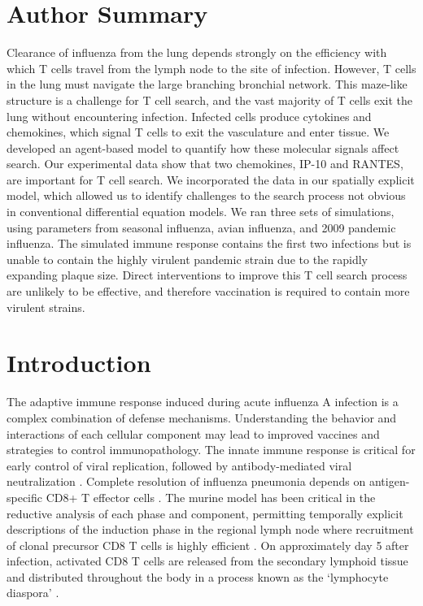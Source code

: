 \documentclass[10pt]{article}
\begin{document}
\section*{Author Summary}

Clearance of influenza from the lung depends strongly on the efficiency with which T cells travel from the lymph node to the site of infection.  However, T cells in the lung must navigate the large branching bronchial network.  This maze-like structure is a challenge for T cell search, and the vast majority of T cells exit the lung without encountering infection.  Infected cells produce cytokines and chemokines, which signal T cells to exit the vasculature and enter tissue.  We developed an agent-based model to quantify how these molecular signals affect search.  Our experimental data show that two chemokines, IP-10 and RANTES, are important for T cell search.  We incorporated the data in our spatially explicit model, which allowed us to identify challenges to the search process not obvious in conventional differential equation models.  We ran three sets of simulations, using parameters from seasonal influenza, avian influenza, and 2009 pandemic influenza.  The simulated immune response contains the first two infections but is unable to contain the highly virulent pandemic strain due to the rapidly expanding plaque size.  Direct interventions to improve this T cell search process are unlikely to be effective, and therefore vaccination is required to contain more virulent strains.

\section*{Introduction}

The adaptive immune response induced during acute influenza A infection is a complex combination of defense mechanisms.  Understanding the behavior and interactions of each cellular component may lead to improved vaccines and strategies to control immunopathology.   The innate immune response is critical for early control of viral replication, followed by antibody-mediated viral neutralization \cite{Kohlmeier2009a, Joo2008, Oslund2011}.   Complete resolution of influenza pneumonia depends on antigen-specific CD8+ T effector cells \cite{Cerwenka1999, Kim2011}.  The murine model has been critical in the reductive analysis of each phase and component, permitting temporally explicit descriptions of the induction phase in the regional lymph node \cite{Miller2003, Allan2006, Ingulli2009} where recruitment of clonal precursor CD8 T cells is highly efficient \cite{VanHeijst2009}.   On approximately day 5 after infection, activated CD8 T cells are released from the secondary lymphoid tissue \cite{Miao2010a} and distributed throughout the body in a process known as the ‘lymphocyte diaspora’ \cite{Marshall2001}.
\end{document}
